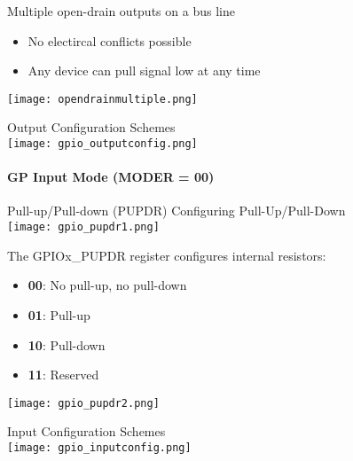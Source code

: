 \begin{corollary}{Multiple open-drain outputs on a bus line}
    \begin{itemize}
        \item No electircal conflicts possible
        \item Any device can pull signal low at any time
    \end{itemize}
    \vspace{3mm}
    \texttt{[image: opendrainmultiple.png]}
\end{corollary}

\multend

\begin{KR}{Output Configuration Schemes}\\
    \texttt{[image: gpio\_outputconfig.png]}
\end{KR}

\paragraph{GP Input Mode (MODER = 00)}

\begin{concept}{Pull-up/Pull-down (PUPDR)} Configuring Pull-Up/Pull-Down\\
    \texttt{[image: gpio\_pupdr1.png]}

    \begin{minipage}{0.6\linewidth}
    The GPIOx\_PUPDR register configures internal resistors:
    \begin{itemize}
        \item \textbf{00}: No pull-up, no pull-down
        \item \textbf{01}: Pull-up
        \item \textbf{10}: Pull-down
        \item \textbf{11}: Reserved
    \end{itemize}
    \end{minipage}
    \begin{minipage}{0.4\linewidth}
        \texttt{[image: gpio\_pupdr2.png]}
    \end{minipage}
\end{concept}



\begin{KR}{Input Configuration Schemes}\\
  \texttt{[image: gpio\_inputconfig.png]}
\end{KR}


